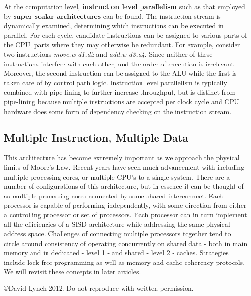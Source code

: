 \documentclass[10pt,a4paper]{article}
\begin{document}
At the computation level, {\bf instruction level parallelism} such as that employed by {\bf super scalar architectures} can be found. The instruction stream is dynamically examined, determining which instructions can be executed in parallel. For each cycle, candidate instructions can be assigned to various parts of the CPU, parts where they may otherwise be redundant. For example, consider two instructions {\it move.w d1,d2} and {\it add.w d3,d4}. Since neither of these instructions interfere with each other, and the order of execution is irrelevant. Moreover, the second instruction can be assigned to the ALU while the first is taken care of by control path logic. Instruction level parallelism is typically combined with pipe-lining to further increase throughput, but is distinct from pipe-lining because multiple instructions are accepted per clock cycle and CPU hardware does some form of dependency checking on the instruction stream. 
\subsection{Multiple Instruction, Multiple Data}
This architecture has become extremely important as we approach the physical limits of Moore's Law. Recent years have seen much advancement with including multiple processing cores, or multiple CPU's to a single system. There are a number of configurations of this architecture, but in essence it can be thought of as multiple processing cores connected by some shared interconnect. Each processor is capable of performing independently, with some direction from either a controlling processor or set of processors. Each processor can in turn implement all the efficiencies of a SISD architecture while addressing the same physical address space. Challenges of connecting multiple processors together tend to circle around  consistency of operating concurrently on shared data - both in main memory and in dedicated - level 1 - and shared - level 2 - caches. Strategies include lock-free programming as well as memory and cache coherency protocols. We will revisit these concepts in later articles.  
{}

\begin{center}
{\small \copyright  David Lynch 2012. Do not reproduce with written permission.}
\end{center}
\end{document}
